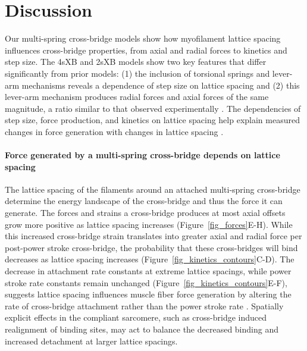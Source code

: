 \documentclass[10pt]{article}
\newcommand{\citep}[1]{\cite{#1}} %
\begin{document}


\section*{Discussion} %

Our multi-spring cross-bridge models show how myofilament lattice spacing influences cross-bridge properties, from axial and radial forces to kinetics and step size. 
The 4sXB and 2sXB models show two key features that differ significantly from prior models: (1) the inclusion of torsional springs and lever-arm mechanisms reveals a dependence of step size on lattice spacing and (2) this lever-arm mechanism produces radial forces and axial forces of the same magnitude, a ratio similar to that observed experimentally \citep{Maughan1981, Cecchi1990, Brenner1991}. 
The dependencies of step size, force production, and kinetics on lattice spacing help explain measured changes in force generation with changes in lattice spacing \citep{Millman1998}. 

\paragraph{Force generated by a multi-spring cross-bridge depends on lattice spacing} %
The lattice spacing of the filaments around an attached multi-spring cross-bridge determine the energy landscape of the cross-bridge and thus the force it can generate. 
The forces and strains a cross-bridge produces at most axial offsets grow more positive as lattice spacing increases (Figure~\ref{fig_forces}E-H). 
While this increased cross-bridge strain translates into greater axial and radial force per post-power stroke cross-bridge, the probability that these cross-bridges will bind decreases as lattice spacing increases (Figure~\ref{fig_kinetics_contours}C-D).
The decrease in attachment rate constants at extreme lattice spacings, while power stroke rate constants remain unchanged (Figure~\ref{fig_kinetics_contours}E-F), suggests lattice spacing influences muscle fiber force generation by altering the rate of cross-bridge attachment rather than the power stroke rate \citep{Martyn2004}. 
Spatially explicit effects in the compliant sarcomere, such as cross-bridge induced realignment of binding sites, may act to balance the decreased binding and increased detachment at larger lattice spacings.
\end{document}

